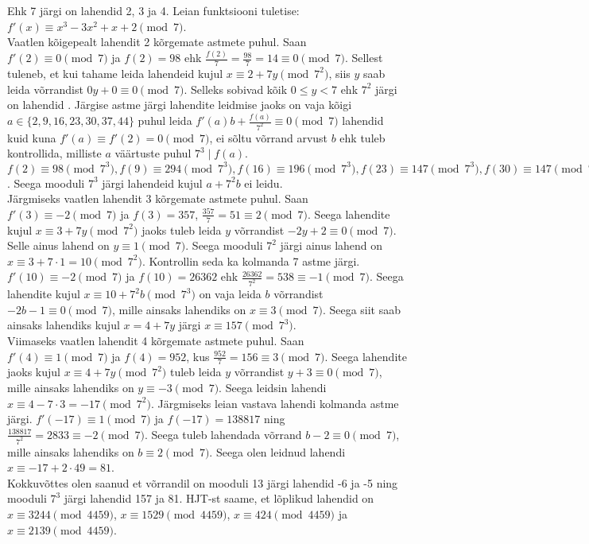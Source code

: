 \documentclass[a4paper, 10pt]{article}
\begin{document}
Ehk 7 järgi on lahendid 2, 3 ja 4. Leian funktsiooni tuletise: $f'(x)\equiv x^3-3x^2+x+2\pmod7$.\\
Vaatlen kõigepealt lahendit 2 kõrgemate astmete puhul. Saan $f'(2)\equiv0\pmod7$ ja $f(2)=98$ ehk $\frac{f(2)}{7}=\frac{98}{7}=14\equiv0\pmod7$. Sellest tuleneb, et kui tahame leida lahendeid kujul $x\equiv2+7y\pmod{7^2}$, siis $y$ saab leida võrrandist $0y+0\equiv0\pmod{7}$. Selleks sobivad kõik $0\leq y<7$ ehk $7^2$ järgi on lahendid . Järgise astme järgi lahendite leidmise jaoks on vaja kõigi $a\in\{2,9,16,23,30,37,44\}$ puhul leida $f'(a)b+\frac{f(a)}{7^2}\equiv0\pmod7$ lahendid kuid kuna $f'(a)\equiv f'(2)=0\pmod7$, ei sõltu võrrand arvust $b$ ehk tuleb kontrollida, milliste $a$ väärtuste puhul $7^3\mid f(a)$. $f(2)\equiv98\pmod{7^3},f(9)\equiv294\pmod{7^3},f(16)\equiv196\pmod{7^3},f(23)\equiv147\pmod{7^3},f(30)\equiv147\pmod{7^3},f(37)\equiv196\pmod{7^3},f(44)\equiv294\pmod{7^3}$. Seega mooduli $7^3$ järgi lahendeid kujul $a+7^2b$ ei leidu.\\
Järgmiseks vaatlen lahendit 3 kõrgemate astmete puhul. Saan $f'(3)\equiv-2\pmod7$ ja $f(3)=357$, $\frac{357}{7}=51\equiv2\pmod7$. Seega lahendite kujul $x\equiv3+7y\pmod{7^2}$ jaoks tuleb leida $y$ võrrandist $-2y+2\equiv0\pmod7$. Selle ainus lahend on $y\equiv1\pmod7$. Seega mooduli $7^2$ järgi ainus lahend on $x\equiv3+7\cdot1=10\pmod{7^2}$. Kontrollin seda ka kolmanda 7 astme järgi. $f'(10)\equiv-2\pmod7$ ja $f(10)=26362$ ehk $\frac{26362}{7^2}=538\equiv-1\pmod7$. Seega lahendite kujul $x\equiv10+7^2b\pmod{7^3}$ on vaja leida $b$ võrrandist $-2b-1\equiv0\pmod{7}$, mille ainsaks lahendiks on $x\equiv3\pmod{7}$. Seega siit saab ainsaks lahendiks kujul $x=4+7y$ järgi $x\equiv157\pmod{7^3}$.\\
Viimaseks vaatlen lahendit 4 kõrgemate astmete puhul. Saan $f'(4)\equiv1\pmod7$ ja $f(4)=952$, kus $\frac{952}{7}=156\equiv3\pmod7$. Seega lahendite jaoks kujul $x\equiv4+7y\pmod{7^2}$ tuleb leida $y$ võrrandist $y+3\equiv0\pmod7$, mille ainsaks lahendiks on $y\equiv-3\pmod7$. Seega leidsin lahendi $x\equiv4-7\cdot3=-17\pmod{7^2}$. Järgmiseks leian vastava lahendi kolmanda astme järgi. $f'(-17)\equiv1\pmod7$ ja $f(-17)=138817$ ning $\frac{138817}{7^2}=2833\equiv-2\pmod7$. Seega tuleb lahendada võrrand $b-2\equiv0\pmod7$, mille ainsaks lahendiks on $b\equiv2\pmod7$. Seega olen leidnud lahendi $x\equiv-17+2\cdot49=81$.\\
Kokkuvõttes olen saanud et võrrandil on mooduli 13 järgi lahendid -6 ja -5 ning mooduli $7^3$ järgi lahendid 157 ja 81. HJT-st saame, et lõplikud lahendid on $x\equiv3244\pmod{4459}$, $x\equiv1529\pmod{4459}$, $x\equiv424\pmod{4459}$ ja $x\equiv2139\pmod{4459}$.
\end{document}

